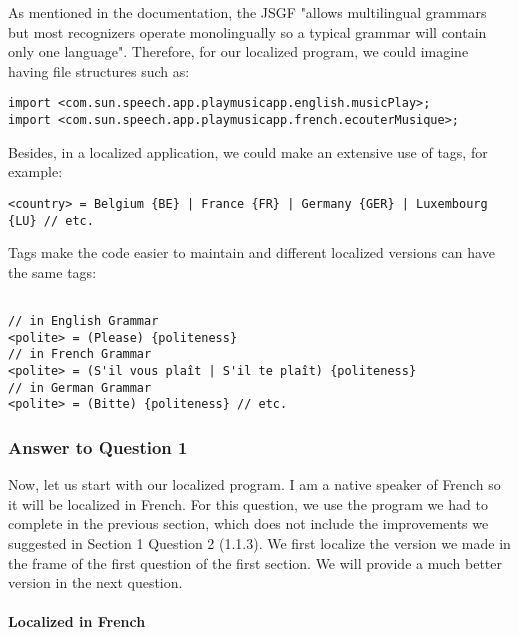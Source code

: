 \documentclass[12pt, a4paper]{article}
\begin{document}
As mentioned in the documentation, the JSGF "allows multilingual grammars but most recognizers operate monolingually so a typical grammar will contain only one language".  Therefore, for our localized program, we could imagine having file structures such as: 

\begin{lstlisting}
import <com.sun.speech.app.playmusicapp.english.musicPlay>;
import <com.sun.speech.app.playmusicapp.french.ecouterMusique>;
\end{lstlisting}

Besides, in a localized application, we could make an extensive use of tags, for example: 

\begin{lstlisting}
<country> = Belgium {BE} | France {FR} | Germany {GER} | Luxembourg {LU} // etc.
\end{lstlisting}

Tags make the code easier to maintain and different localized versions can have the same tags:

\begin{lstlisting}

// in English Grammar
<polite> = (Please) {politeness}
// in French Grammar
<polite> = (S'il vous plaît | S'il te plaît) {politeness}
// in German Grammar
<polite> = (Bitte) {politeness} // etc.
\end{lstlisting}

\subsubsection{Answer to Question 1}

Now, let us start with our localized program. I am a native speaker of French so it will be localized in French. For this question, we use the program we had to complete in the previous section, which does not include the improvements we suggested in Section 1 Question 2 (1.1.3). We first localize the version we made in the frame of the first question of the first section. We will provide a much better version in the next question.

\paragraph{Localized in French}\mbox{}
\end{document}
